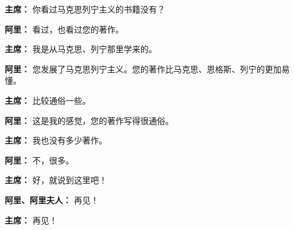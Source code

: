 \begin{list}{}
\item[\textbf{主席：}] 你看过马克思列宁主义的书籍没有？

\item[\textbf{阿里：}] 看过，也看过您的著作。

\item[\textbf{主席：}] 我是从马克思、列宁那里学来的。

\item[\textbf{阿里：}] 您发展了马克思列宁主义。您的著作比马克思、恩格斯、列宁的更加易懂。

\item[\textbf{主席：}] 比较通俗一些。

\item[\textbf{阿里：}] 这是我的感觉，您的著作写得很通俗。

\item[\textbf{主席：}] 我也没有多少著作。

\item[\textbf{阿里：}] 不，很多。

\item[\textbf{主席：}] 好，就说到这里吧！

\item[\textbf{阿里、阿里夫人：}] 再见！

\item[\textbf{主席：}] 再见！

\end{list}